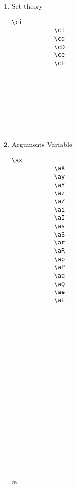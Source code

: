 \documentclass[10pt, a4paper]{article}
\begin{document}
\begin{enumerate}
\begin{center}
		\end{center}
		Every logic constant exists in two version, normal and bold. For the bold version just write the second letter in uppercase. All junctor constants have a second mode that automatically adds a space behind them. To use this mode just write the first letter in uppercase. Both versions can be combined.
		\item Set theory \begin{center}
			\begin{minipage}[h][8.6cm][t]{15em}
				\begin{lstlisting}[style=B]
			\ci
			\cI
			\cd
			\cD
			\ce
			\cE
				\end{lstlisting}
			\end{minipage}
			\begin{minipage}[h][8.6cm][t]{15em}
				\begin{fgls}
					\ \\
					\ci\\
					\cI\\
					\cd\\
					\cD\\
					\ce\\
					\cE
				\end{fgls}
			\end{minipage}
		\end{center}
		\item Arguments Variable
		\begin{center}
			\begin{minipage}[h][8cm][t]{15em}
				\begin{lstlisting}[style=B]
			\ax
			\aX
			\ay
			\aY
			\az
			\aZ
			\ai
			\aI
			\as
			\aS
			\ar
			\aR
			\ap
			\aP
			\aq
			\aQ
			\ae
			\aE
				\end{lstlisting}
			\end{minipage}
			\begin{minipage}[h][8cm][t]{15em}
				\begin{fgls}
					\ \\
					\ax\\
					\aX\\
					\ay\\
					\aY\\
					\az\\
					\aZ\\
					\ai\\
					\aI\\
					\as\\
					\aS\\
					\ar\\
					\aR\\
					\ap\\
					\aP\\
					\aq\\
					\aQ\\
					\ae\\
					\aE
				\end{fgls}
			\end{minipage}
		\end{center}
		

\end{enumerate}
\end{document}

